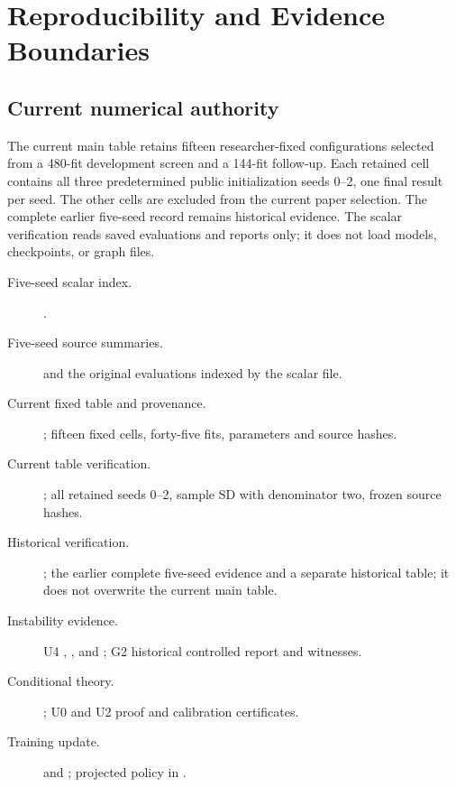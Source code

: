 \chapter{Reproducibility and Evidence Boundaries}\label{app:evidence}
\section{Current numerical authority}
The current main table retains fifteen researcher-fixed configurations selected from a 480-fit development screen and a 144-fit follow-up. Each retained cell contains all three predetermined public initialization seeds 0--2, one final result per seed. The other cells are excluded from the current paper selection. The complete earlier five-seed record remains historical evidence. The scalar verification reads saved evaluations and reports only; it does not load models, checkpoints, or graph files.

\begingroup\small\raggedright
\begin{description}
\item[Five-seed scalar index.] .
\item[Five-seed source summaries.]  and the original evaluations indexed by the scalar file.
\item[Current fixed table and provenance.] ; fifteen fixed cells, forty-five fits, parameters and source hashes.
\item[Current table verification.] ; all retained seeds 0--2, sample SD with denominator two, frozen source hashes.
\item[Historical verification.] ; the earlier complete five-seed evidence and a separate historical table; it does not overwrite the current main table.
\item[Instability evidence.] U4 , , and ; G2 historical controlled report and witnesses.
\item[Conditional theory.] ; U0 and U2 proof and calibration certificates.
\item[Training update.]  and ; projected policy in .
\end{description}
\endgroup

